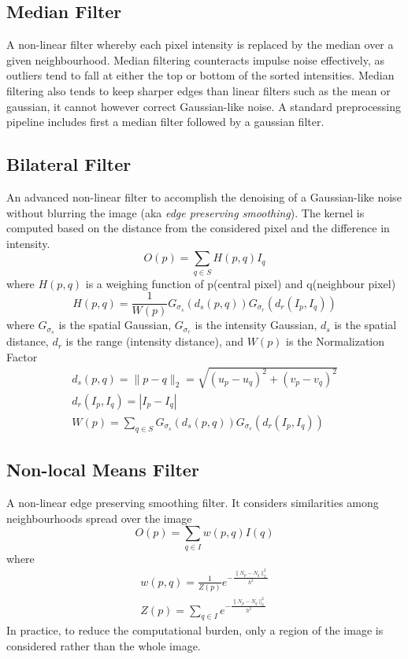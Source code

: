 \documentclass{article}
\begin{document}
\subsection{Median Filter}
A non-linear filter whereby each pixel intensity is replaced by the median over a given neighbourhood. Median filtering counteracts impulse noise effectively, as outliers tend to fall at either the top or bottom of the sorted intensities. Median filtering also tends to keep sharper edges than linear filters such as the mean or gaussian, it cannot however correct Gaussian-like noise. A standard preprocessing pipeline includes first a median filter followed by a gaussian filter.
\subsection{Bilateral Filter}
An advanced non-linear filter to accomplish the denoising of a Gaussian-like noise without blurring the image (aka \emph{edge preserving smoothing}). The kernel is computed based on the distance from the considered pixel and the difference in intensity.
\[
    O(p)=\sum_{q\in S} H(p,q)I_q
\]
where $H(p,q)$ is a weighing function of p(central pixel) and q(neighbour pixel)
\[
    H(p,q) = \frac{1}{W(p)}G_{\sigma_s}(d_s(p,q))G_{\sigma_r}(d_r(I_p,I_q))
\]
where $G_{\sigma_s}$ is the spatial Gaussian, $G_{\sigma_r}$ is the intensity Gaussian, $d_s$ is the spatial distance, $d_r$ is the range (intensity distance), and $W(p)$ is the Normalization Factor
\begin{gather*}
    d_s(p,q) = \|p-q\|_2 = \sqrt{(u_p-u_q)^2+(v_p-v_q)^2}\\
    d_r(I_p,I_q) = |I_p-I_q|\\
    W(p)= \sum_{q\in S} G_{\sigma_s}(d_s(p,q))G_{\sigma_r}(d_r(I_p,I_q))
\end{gather*}
\subsection{Non-local Means Filter}
A non-linear edge preserving smoothing filter. It considers similarities among neighbourhoods spread over the image
\[
    O(p) = \sum_{q\in I}w(p,q)I(q)
\]
where
\begin{gather*}
    w(p,q)=\frac{1}{Z(p)}e^{-\frac{\|N_p-N_q\|^2_2}{h^2}}\\
    Z(p) = \sum_{q\in I} e^{-\frac{\|N_p-N_q\|^2_2}{h^2}}
\end{gather*}
In practice, to reduce the computational burden, only a region of the image is considered rather than the whole image.
\end{document}
